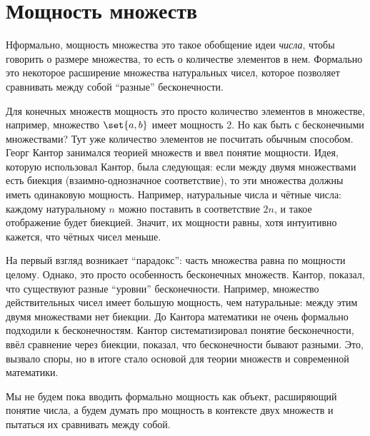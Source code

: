 \documentclass{article}
\begin{document}
\newpage

\section{Мощность множеств}

Нформально, мощность множества это такое обобщение идеи \textit{числа}, чтобы говорить о размере множества, то есть о количестве элементов в нем. Формально это некоторое расширение множества натуральных чисел, которое позволяет сравнивать между собой \enquote{разные} бесконечности.


Для конечных множеств мощность это просто количество элементов в множестве, например, множество \(\set{a, b}\) имеет мощность 2. Но как быть с бесконечными множествами? Тут уже количество элементов не посчитать обычным способом. Георг Кантор занимался теорией множеств и ввел понятие мощности. Идея, которую использовал Кантор, была следующая: если между двумя множествами есть биекция (взаимно-однозначное соответствие), то эти множества должны иметь одинаковую мощность. Например, натуральные числа и чётные числа: каждому натуральному \(n\) можно поставить в соответствие \(2n\), и такое отображение будет биекцией. Значит, их мощности равны, хотя интуитивно кажется, что чётных чисел меньше.

На первый взгляд возникает \enquote{парадокс}: часть множества равна по мощности целому. Однако, это просто особенность бесконечных множеств. Кантор, показал, что существуют разные \enquote{уровни} бесконечности. Например, множество действительных чисел имеет большую мощность, чем натуральные: между этим двумя множествами нет биекции. До Кантора математики не очень формально подходили к бесконечностям. Кантор систематизировал понятие бесконечности, ввёл сравнение через биекции, показал, что бесконечности бывают разными. Это, вызвало споры, но в итоге стало основой для теории множеств и современной математики.

Мы не будем пока вводить формально мощность как объект, расширяющий понятие числа, а будем думать про мощность в контексте двух множеств и пытаться их сравнивать между собой.
\end{document}
